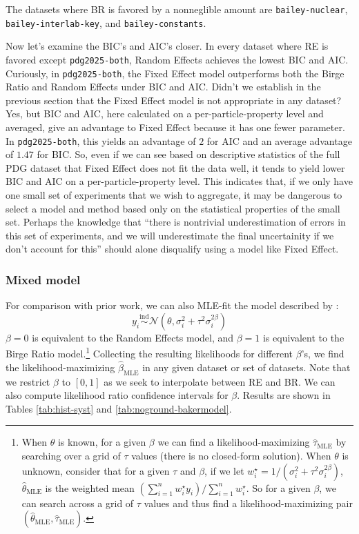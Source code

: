 \documentclass[letterpaper,12pt]{article}
\begin{document}
The datasets where BR is favored by a nonneglible amount are \texttt{bailey-nuclear}, \texttt{bailey-interlab-key}, and \texttt{bailey-constants}.

Now let's examine the BIC's and AIC's closer. In every dataset where RE is favored except \texttt{pdg2025-both}, Random Effects achieves the lowest BIC and AIC. Curiously, in \texttt{pdg2025-both}, the Fixed Effect model outperforms both the Birge Ratio and Random Effects under BIC and AIC. Didn't we establish in the previous section that the Fixed Effect model is not appropriate in any dataset? Yes, but BIC and AIC, here calculated on a per-particle-property level and averaged, give an advantage to Fixed Effect because it has one fewer parameter. In \texttt{pdg2025-both}, this yields an advantage of $2$ for AIC and an average advantage of $1.47$ for BIC. So, even if we can see based on descriptive statistics of the full PDG dataset that Fixed Effect does not fit the data well, it tends to yield lower BIC and AIC on a per-particle-property level. This indicates that, if we only have one small set of experiments that we wish to aggregate, it may be dangerous to select a model and method based only on the statistical properties of the small set. Perhaps the knowledge that ``there is nontrivial underestimation of errors in this set of experiments, and we will underestimate the final uncertainity if we don't account for this'' should alone disqualify using a model like Fixed Effect.

\subsubsection{Mixed model}
For comparison with prior work, we can also MLE-fit the model described by \citet[eq.~4]{baker2013meta}:
\begin{equation}\label{eq:bakermodel}
  y_i\overset{\mathrm{ind}}\sim\mathcal{N}(\theta,\sigma_i^2+\tau^2\sigma_i^{2\beta})
\end{equation}
$\beta=0$ is equivalent to the Random Effects model, and $\beta=1$ is equivalent to the Birge Ratio model.\footnote{
When $\theta$ is known, for a given $\beta$ we can find a likelihood-maximizing $\hat\tau_{\mathrm{MLE}}$ by searching over a grid of $\tau$ values (there is no closed-form solution). %
When $\theta$ is unknown, consider that for a given $\tau$ and $\beta$, if we let $w_i^\star=1/\left(\sigma_i^2+\tau^2\sigma_i^{2\beta}\right)$, $\hat\theta_{\mathrm{MLE}}$ is the weighted mean $(\sum_{i=1}^nw_i^\star y_i)/\sum_{i=1}^nw_i^\star$. So for a given $\beta$, we can search across a grid of $\tau$ values and thus find a likelihood-maximizing pair $(\hat\theta_{\mathrm{MLE}},\hat\tau_{\mathrm{MLE}})$.
}
Collecting the resulting likelihoods for different $\beta$'s, we find the likelihood-maximizing $\hat\beta_{\mathrm{MLE}}$ in any given dataset or set of datasets. Note that we restrict $\beta$ to $[0,1]$ as we seek to interpolate between RE and BR. We can also compute likelihood ratio confidence intervals for $\beta$. %
Results are shown in Tables \ref{tab:hist-syst} and \ref{tab:noground-bakermodel}.
\end{document}
